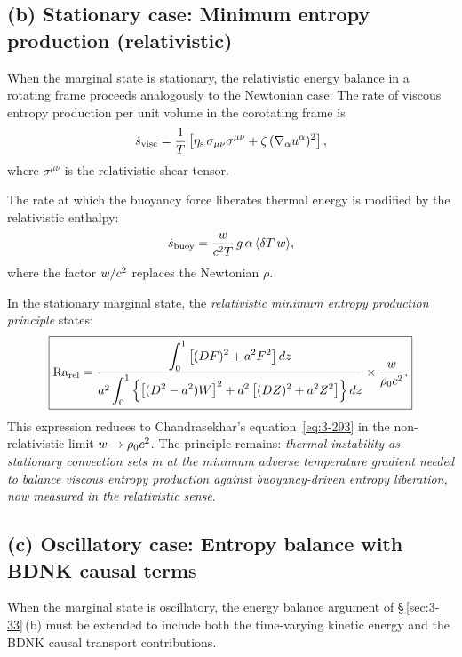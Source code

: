 \subsection*{(b) Stationary case: Minimum entropy production (relativistic)}

When the marginal state is stationary, the relativistic energy balance
in a rotating frame proceeds analogously to the Newtonian case.  The
rate of viscous entropy production per unit volume in the corotating
frame is
\begin{equation}\label{eq:rel-3-284}
  \dot{s}_{\mathrm{visc}} = \frac{1}{T}\left[\eta_{\mathrm{s}}\,\sigma_{\mu\nu}\sigma^{\mu\nu}
  + \zeta\,(\nabla_{\alpha} u^{\alpha})^2\right],
\end{equation}
where $\sigma^{\mu\nu}$ is the relativistic shear tensor.

The rate at which the buoyancy force liberates thermal energy is
modified by the relativistic enthalpy:
\begin{equation}\label{eq:rel-3-285}
  \dot{s}_{\mathrm{buoy}} = \frac{w}{c^2 T}\,
  g\,\alpha\,\langle\delta T\, w\rangle,
\end{equation}
where the factor $w / c^2$ replaces the Newtonian $\rho$.

In the stationary marginal state, the \emph{relativistic minimum entropy
production principle} states:
\begin{equation}\label{eq:rel-3-286}
  \boxed{\mathrm{Ra}_{\mathrm{rel}} = \frac{\displaystyle\int_0^1 \left[(DF)^2 + a^2 F^2\right]dz}
  {a^2\displaystyle\int_0^1 \left\{\left[(D^2 - a^2)W\right]^2
  + d^2\left[(DZ)^2 + a^2 Z^2\right]\right\}dz}
  \times \frac{w}{\rho_0 c^2}.}
\end{equation}
This expression reduces to Chandrasekhar's equation~\eqref{eq:3-293}
in the non-relativistic limit $w \to \rho_0 c^2$.  The
principle remains: \emph{thermal instability as stationary convection
sets in at the minimum adverse temperature gradient needed to balance
viscous entropy production against buoyancy-driven entropy liberation,
now measured in the relativistic sense}.

\subsection*{(c) Oscillatory case: Entropy balance with BDNK causal terms}

When the marginal state is oscillatory, the energy balance argument of
\S\,\ref{sec:3-33}\,(b) must be extended to include both the
time-varying kinetic energy and the BDNK causal transport
contributions.

